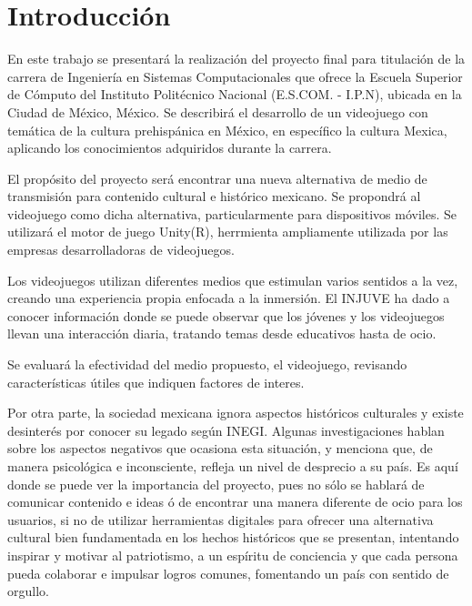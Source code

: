 \chapter{Introducción}


En este trabajo se presentará la realización del proyecto final para titulación de la carrera de Ingeniería
en Sistemas Computacionales que ofrece la Escuela Superior de Cómputo del Instituto Politécnico Nacional (E.S.COM. - I.P.N), 
ubicada en la Ciudad de México, México. Se describirá el desarrollo de un videojuego con temática de la cultura
prehispánica en México, en específico la cultura Mexica, aplicando los conocimientos adquiridos durante la carrera. 

El propósito del proyecto será encontrar una nueva alternativa de medio de transmisión para
contenido cultural e histórico mexicano. Se propondrá al videojuego como dicha alternativa, 
particularmente para dispositivos móviles. Se utilizará el motor de juego Unity(R), 
herrmienta ampliamente utilizada por las empresas desarrolladoras de videojuegos.

Los videojuegos utilizan diferentes medios que estimulan varios sentidos a la vez, creando una experiencia propia
enfocada a la inmersión. El INJUVE ha dado a conocer información\cite{injuveespana2005} donde se puede observar que los
jóvenes y los videojuegos llevan una interacción diaria, tratando temas desde educativos hasta de ocio.

Se evaluará la efectividad del medio propuesto, el videojuego, revisando características útiles que indiquen
factores de interes. 

Por otra parte, la sociedad mexicana ignora aspectos históricos culturales y existe desinterés por conocer su legado
según INEGI\cite{inegi2017}. Algunas investigaciones\cite{guillermobonfilbatalla1987} hablan sobre los aspectos negativos que 
ocasiona esta situación, y menciona que, de manera psicológica e inconsciente, refleja un nivel de desprecio a su país.
Es aquí donde se puede ver la importancia del proyecto, pues no sólo se hablará de comunicar contenido 
e ideas ó de encontrar una manera diferente de ocio para los usuarios, 
si no de utilizar herramientas digitales para %
ofrecer una alternativa cultural bien fundamentada en los hechos históricos que se presentan, intentando inspirar 
y motivar al patriotismo, a un espíritu de conciencia y que cada persona pueda colaborar e impulsar logros comunes,
fomentando un país con sentido de orgullo.


